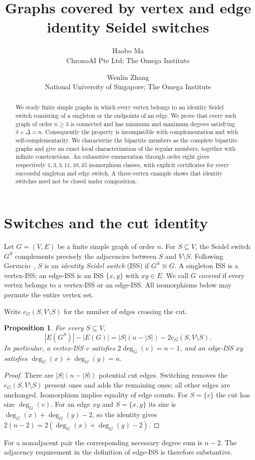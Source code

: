 \documentclass[11pt]{article}
\title{Graphs covered by vertex and edge identity Seidel switches}
\author{Haobo Ma\\{\small ChronoAI Pte Ltd; The Omega Institute}
\and Wenlin Zhang\\{\small National University of Singapore; The Omega Institute}}
\date{}
\newtheorem{proposition}[theorem]{Proposition}
\theoremstyle{definition}
\begin{document}
\maketitle
\begin{abstract}
We study finite simple graphs in which every vertex belongs to an identity
Seidel switch consisting of a singleton or the endpoints of an edge.
We prove that every such graph of order $n\geq3$ is connected and has
minimum and maximum degrees satisfying $\delta+\Delta=n$.
Consequently the property is incompatible with complementation and with
self-complementarity. We characterize the bipartite members as the complete
bipartite graphs and give an exact local characterization of the regular
members, together with infinite constructions. An exhaustive enumeration
through order eight gives respectively $1,3,3,11,10,35$ isomorphism classes,
with explicit certificates for every successful singleton and edge switch.
A three-vertex example shows that identity switches need not be closed
under composition.
\end{abstract}

\section{Switches and the cut identity}
Let $G=(V,E)$ be a finite simple graph of order $n$. For $S\subseteq V$,
the Seidel switch $G^S$ complements precisely the adjacencies between $S$
and $V\setminus S$. Following Gervacio~\cite{gervacio}, $S$ is an
\emph{identity Seidel switch} (ISS) if $G^S\cong G$. A singleton ISS is a
vertex-ISS; an edge-ISS is an ISS $\{x,y\}$ with $xy\in E$. We call $G$
\emph{covered} if every vertex belongs to a vertex-ISS or an edge-ISS.
All isomorphisms below may permute the entire vertex set.

Write $e_G(S,V\setminus S)$ for the number of edges crossing the cut.
\begin{proposition}\label{cut}
For every $S\subseteq V$,
\[
 |E(G^S)|-|E(G)|=|S|(n-|S|)-2e_G(S,V\setminus S).
\]
In particular, a vertex-ISS $v$ satisfies $2\deg_G(v)=n-1$, and an
edge-ISS $xy$ satisfies $\deg_G(x)+\deg_G(y)=n$.
\end{proposition}
\begin{proof}
There are $|S|(n-|S|)$ potential cut edges. Switching removes the
$e_G(S,V\setminus S)$ present ones and adds the remaining ones; all other
edges are unchanged. Isomorphism implies equality of edge counts.
For $S=\{v\}$ the cut has size $\deg_G(v)$. For an edge $xy$ and
$S=\{x,y\}$ its size is $\deg_G(x)+\deg_G(y)-2$, so the identity gives
$2(n-2)=2(\deg_G(x)+\deg_G(y)-2)$.
\end{proof}
For a nonadjacent pair the corresponding necessary degree sum is $n-2$.
The adjacency requirement in the definition of edge-ISS is therefore
substantive.
\end{document}
